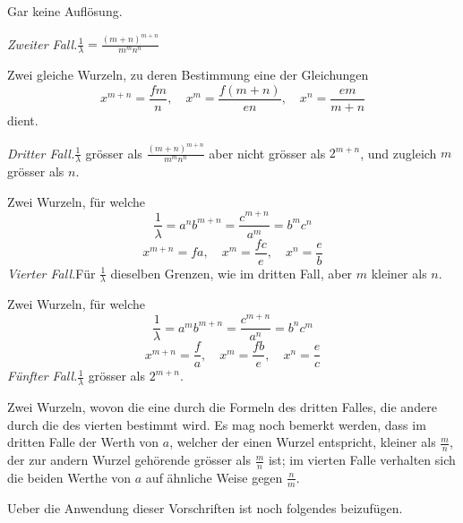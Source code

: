 Gar keine Auflösung.

\textit{Zweiter Fall.}\quad $\frac{1}{\lambda}=\frac{(m+n)^{m+n}}{m^mn^n}$

Zwei gleiche Wurzeln, zu deren Bestimmung eine der Gleichungen
\[
x^{m+n}=\frac{fm}{n},\quad x^m=\frac{f(m+n)}{en},\quad x^n=\frac{em}{m+n}
\]
dient.

\textit{Dritter Fall.}\quad $\frac{1}{\lambda}$ grösser als $\frac{(m+n)^{m+n}}{m^mn^n}$ aber nicht grösser als $2^{m+n}$, und zugleich
$m$ grösser als $n$.

Zwei Wurzeln, für welche
\[
\frac{1}{\lambda}=a^nb^{m+n}=\frac{c^{m+n}}{a^m}=b^mc^n
\]
\[
x^{m+n}=fa,\quad x^m=\frac{fc}{e},\quad x^n=\frac{e}{b}
\]
\textit{Vierter Fall.}\quad Für $\frac{1}{\lambda}$ dieselben Grenzen, wie im dritten Fall, aber $m$ kleiner
als $n$.

Zwei Wurzeln, für welche
\[
\frac{1}{\lambda}=a^mb^{m+n}=\frac{c^{m+n}}{a^n}=b^nc^m
\]
\[
x^{m+n}=\frac{f}{a},\quad x^m=\frac{fb}{e},\quad x^n=\frac{e}{c}
\]
\textit{Fünfter Fall.}\quad $\frac{1}{\lambda}$ grösser als $2^{m+n}$.

Zwei Wurzeln, wovon die eine durch die Formeln des dritten Falles, die
andere durch die des vierten bestimmt wird.
Es mag noch bemerkt werden, dass im dritten Falle der Werth von $a$, welcher der einen Wurzel entspricht, kleiner als $\frac{m}{n}$, der zur andern Wurzel gehörende grösser als $\frac{m}{n}$ ist; im vierten Falle verhalten sich die beiden Werthe von
$a$ auf ähnliche Weise gegen $\frac{n}{m}$.

Ueber die Anwendung dieser Vorschriften ist noch folgendes beizufügen.


